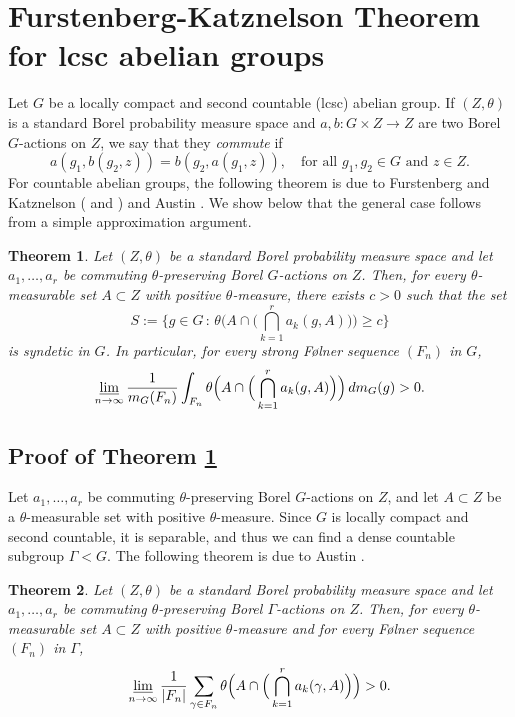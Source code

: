\documentclass[12pt,reqno,a4paper]{amsart}
\numberwithin{equation}{section}
\newcommand{\ra}{\rightarrow}
\theoremstyle{theorem}
\newtheorem{theorem}{Theorem}[section]
\theoremstyle{task}
\theoremstyle{definition}
\begin{document}
\section{Furstenberg-Katznelson Theorem for lcsc abelian groups}
\label{Sec:FK}
Let $G$ be a locally compact and second countable (lcsc) abelian group. If $(Z,\theta)$
is a standard Borel probability measure space and $a, b : G \times Z \ra Z$ are two Borel $G$-actions on $Z$, we say that they \emph{commute} if
\[
a(g_1,b(g_2,z)) = b(g_2,a(g_1,z)), \quad \textrm{for all $g_1,g_2 \in G$ and $z \in Z$}.
\]
For countable abelian groups, the following theorem is due to Furstenberg and 
Katznelson (\cite[Theorem B]{FK1} and \cite[Secion 3]{FK2}) and Austin 
\cite[Theorem B]{austin}. We show below that the general case
follows from a simple approximation argument. 

\begin{theorem}
\label{Thm_SyndMultRecG}
Let $(Z,\theta)$ be a standard Borel probability measure space and let $a_1,\ldots,a_r$ be commuting 
$\theta$-preserving Borel $G$-actions on $Z$. Then, for every $\theta$-measurable set $A \subset Z$
with positive $\theta$-measure, there exists $c > 0$ such that the set
\[
S := \Big\{ g \in G \, : \, 
\theta\Big(A \cap \Big( \bigcap_{k=1}^r a_k(g,A) \Big)\Big) \geq c \Big\}
\]
is syndetic in $G$. In particular, for every strong F\o lner sequence $(F_n)$ in $G$,
\[
\varliminf_{n \ra \infty} \frac{1}{m_G(F_n)} \int_{F_n} \theta\Big(A \cap \Big( \bigcap_{k=1}^r a_k(g,A) \Big)\Big) \, dm_G(g) > 0.
\]
\end{theorem}

\subsection{Proof of Theorem \ref{Thm_SyndMultRecG}}

Let $a_1,\ldots,a_r$ be commuting $\theta$-preserving Borel $G$-actions on $Z$, and 
let $A \subset Z$ be a $\theta$-measurable set with positive $\theta$-measure. Since
$G$ is locally compact and second countable, it is separable, and thus we can find 
a dense countable subgroup $\Gamma < G$. The following theorem is due to Austin \cite[Theorem B]{austin}.

\begin{theorem}
\label{Thm_austin}
Let $(Z,\theta)$ be a standard Borel probability measure space and let $a_1,\ldots,a_r$ be commuting $\theta$-preserving Borel $\Gamma$-actions on $Z$. Then, for every $\theta$-measurable set $A \subset Z$ with positive $\theta$-measure and for every F\o lner sequence $(F_n)$ in $\Gamma$, 
\[
\varliminf_{n \ra \infty} \frac{1}{|F_n|} \sum_{\gamma \in F_n} 
\theta\Big(A \cap \Big( \bigcap_{k=1}^r a_k(\gamma,A) \Big)\Big)  > 0.
\]
\end{theorem}
\end{document}

